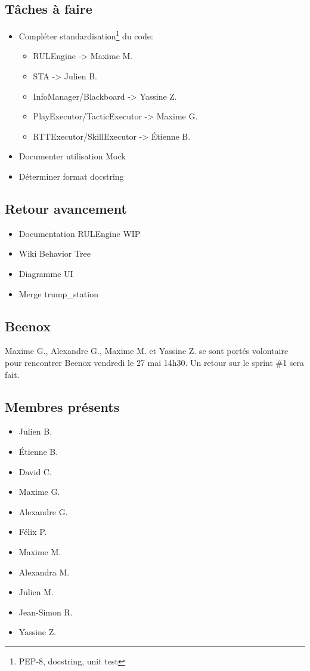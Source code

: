 \documentclass[12pt,letterpaper,twoside]{article}
\begin{document}
\subsection{Tâches à faire}
\begin{itemize}
    \item Compléter standardisation\footnote{PEP-8, docstring, unit test} du code:
            \begin{itemize}
                \item RULEngine -> Maxime M.
                \item STA -> Julien B.
                \item InfoManager/Blackboard -> Yassine Z.
                \item PlayExecutor/TacticExecutor -> Maxime G.
                \item RTTExecutor/SkillExecutor -> \'Etienne B.
            \end{itemize}
        \item Documenter utilisation Mock
        \item D\'eterminer format docstring
\end{itemize}

\subsection*{Retour avancement}
\begin{itemize}
        \item Documentation RULEngine WIP
        \item Wiki Behavior Tree
        \item Diagramme UI
        \item Merge trump\_station
\end{itemize}

\subsection*{Beenox}

Maxime G., Alexandre G., Maxime M. et Yassine Z. se sont port\'es volontaire pour rencontrer Beenox vendredi le 27 mai 14h30.
Un retour sur le sprint \#1 sera fait.


\newpage
\subsection*{Membres présents}
\begin{itemize}
\item Julien B.
\item \'Etienne B.
\item David C.
\item Maxime G.
\item Alexandre G.
\item Félix P.
\item Maxime M.
\item Alexandra M.
\item Julien M.
\item Jean-Simon R.
\item Yassine Z.
\end{itemize}
\end{document}
